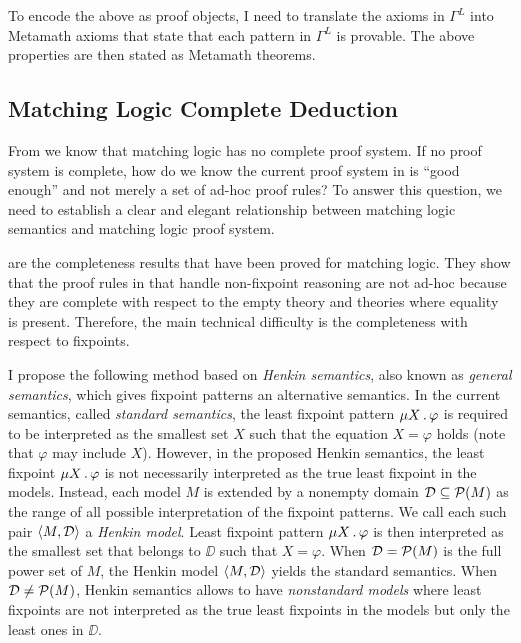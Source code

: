 \documentclass[11pt]{article}
\begin{document}
To encode the above as proof objects, I need to translate the axioms in $\Gamma^L$ into Metamath axioms that state that each pattern in $\Gamma^L$ is provable. 
The above properties are then stated as Metamath theorems.


\subsection{Matching Logic Complete Deduction}
\label{sec:proposed-complete}

From  we know that 
matching logic has no complete proof system.
If no proof system is complete, how do we know the current proof system
in  is ``good enough'' and not merely a set of ad-hoc proof rules?
To answer this question, we need to establish a clear and elegant relationship 
between matching logic semantics and matching logic proof system.

  are the completeness results that have been proved for matching logic.
They show that the proof rules in  
that handle non-fixpoint reasoning are not ad-hoc
because they are complete with respect to the empty theory and theories where 
equality is present. 
Therefore, the main technical difficulty is the completeness with respect to fixpoints. 


I propose the following method based on \emph{Henkin semantics},
also known as \emph{general semantics}, which gives fixpoint patterns
an alternative semantics. 
In the current semantics, called \emph{standard semantics}, 
the least fixpoint pattern $\mu X \,.\, \varphi$
is required to be interpreted as the smallest set $X$ such that the equation $X = \varphi$ 
holds (note that $\varphi$ may include $X$).
However, in the proposed Henkin semantics, the least fixpoint
$\mu X \,.\, \varphi$ is not necessarily interpreted as the true least fixpoint 
in the models. 
Instead, each model $M$ is extended by a nonempty domain
$\mathcal{D} \subseteq \mathcal{P}(M)$ as the range of all possible interpretation of the 
fixpoint patterns. 
We call each such pair $\left\langle M,\mathcal{D}\right\rangle$ a \emph{Henkin model}. 
Least fixpoint pattern $\mu X \,.\, \varphi$ is then interpreted as the smallest 
set that belongs to $\DD$ such that $X = \varphi$. 
When $\mathcal{D} = \mathcal{P}(M)$ is the full power set of $M$, the Henkin model
$\left\langle M,\mathcal{D}\right\rangle$ yields the standard semantics. 
When $\mathcal{D} \neq \mathcal{P}(M)$, Henkin semantics allows to 
have \emph{nonstandard models} where least fixpoints are not interpreted as the 
true least fixpoints in the models but only the least ones in $\DD$. 
\end{document}
